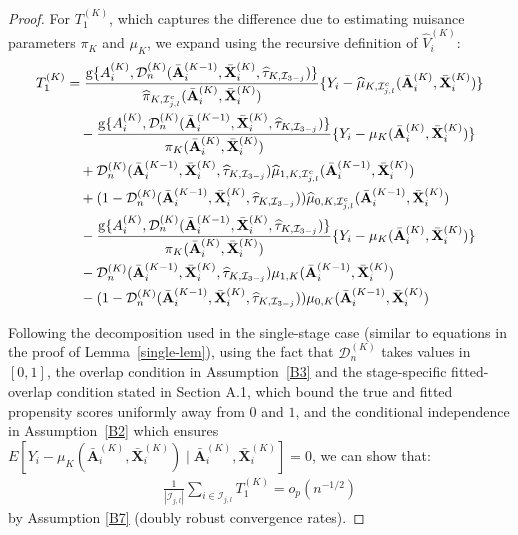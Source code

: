 \documentclass[11pt]{article}
\theoremstyle{referenceplain}
\theoremstyle{referencedefinition}
\theoremstyle{referenceremark}
\begin{document}
\begin{proof}
For $T_1^{(K)}$, which captures the difference due to estimating nuisance parameters $\pi_K$ and $\mu_K$, we expand using the recursive definition of $\widehat{V}_i^{(K)}$:
\begin{align}
    T_1^{(K)} &= \frac{\mathrm{g}\{A_i^{(K)}, \mathcal{D}_n^{(K)}(\bar{\mathbf{A}}_i^{(K-1)},\bar{\mathbf{X}}_i^{(K)},\widehat{\tau}_{K,\mathcal{I}_{3-j}})\}}{\widehat{\pi}_{K,\mathcal{I}_{j,l}^c}(\bar{\mathbf{A}}_i^{(K)},\bar{\mathbf{X}}_i^{(K)})}\{Y_i - \widehat{\mu}_{K,\mathcal{I}_{j,l}^c}(\bar{\mathbf{A}}_i^{(K)},\bar{\mathbf{X}}_i^{(K)})\}\notag\\
    &\quad - \frac{\mathrm{g}\{A_i^{(K)}, \mathcal{D}_n^{(K)}(\bar{\mathbf{A}}_i^{(K-1)},\bar{\mathbf{X}}_i^{(K)},\widehat{\tau}_{K,\mathcal{I}_{3-j}})\}}{\pi_K(\bar{\mathbf{A}}_i^{(K)},\bar{\mathbf{X}}_i^{(K)})}\{Y_i - \mu_K(\bar{\mathbf{A}}_i^{(K)},\bar{\mathbf{X}}_i^{(K)})\}\notag\\
    &\quad + \mathcal{D}_n^{(K)}(\bar{\mathbf{A}}_i^{(K-1)},\bar{\mathbf{X}}_i^{(K)},\widehat{\tau}_{K,\mathcal{I}_{3-j}}) \widehat{\mu}_{1,K,\mathcal{I}_{j,l}^c}(\bar{\mathbf{A}}_i^{(K-1)},\bar{\mathbf{X}}_i^{(K)})\notag\\
&\quad + (1-\mathcal{D}_n^{(K)}(\bar{\mathbf{A}}_i^{(K-1)},\bar{\mathbf{X}}_i^{(K)},\widehat{\tau}_{K,\mathcal{I}_{3-j}})) \widehat{\mu}_{0,K,\mathcal{I}_{j,l}^c}(\bar{\mathbf{A}}_i^{(K-1)},\bar{\mathbf{X}}_i^{(K)})\notag\\
&\quad - \frac{\mathrm{g}\{A_i^{(K)}, \mathcal{D}_n^{(K)}(\bar{\mathbf{A}}_i^{(K-1)},\bar{\mathbf{X}}_i^{(K)},\widehat{\tau}_{K,\mathcal{I}_{3-j}})\}}{\pi_K(\bar{\mathbf{A}}_i^{(K)},\bar{\mathbf{X}}_i^{(K)})} \{Y_i - \mu_K(\bar{\mathbf{A}}_i^{(K)},\bar{\mathbf{X}}_i^{(K)})\}\notag\\
&\quad - \mathcal{D}_n^{(K)}(\bar{\mathbf{A}}_i^{(K-1)},\bar{\mathbf{X}}_i^{(K)},\widehat{\tau}_{K,\mathcal{I}_{3-j}}) \mu_{1,K}(\bar{\mathbf{A}}_i^{(K-1)},\bar{\mathbf{X}}_i^{(K)})\notag\\
&\quad - (1-\mathcal{D}_n^{(K)}(\bar{\mathbf{A}}_i^{(K-1)},\bar{\mathbf{X}}_i^{(K)},\widehat{\tau}_{K,\mathcal{I}_{3-j}})) \mu_{0,K}(\bar{\mathbf{A}}_i^{(K-1)},\bar{\mathbf{X}}_i^{(K)})
\end{align}

Following the decomposition used in the single-stage case (similar to equations in the proof of Lemma~\ref{single-lem}), using the fact that $\mathcal{D}_n^{(K)}$ takes values in $[0,1]$, the overlap condition in Assumption~\ref{B3} {and the stage-specific fitted-overlap condition stated in Section A.1}{,} which {bound} the {true and fitted} propensity scores uniformly away from $0$ and $1$, and the conditional independence in Assumption~\ref{B2} which ensures 
$E[Y_i - \mu_K(\bar{\mathbf{A}}_i^{(K)},\bar{\mathbf{X}}_i^{(K)}) \mid \bar{\mathbf{A}}_i^{(K)}, \bar{\mathbf{X}}_i^{(K)}] = 0$, we can show that:
\begin{align}
    \frac{1}{|\mathcal{I}_{j,l}|}\sum_{i\in\mathcal{I}_{j,l}} T_1^{(K)} = o_p(n^{-1/2})
\end{align}
by Assumption \ref{B7} (doubly robust convergence rates).


\end{proof}
\end{document}
